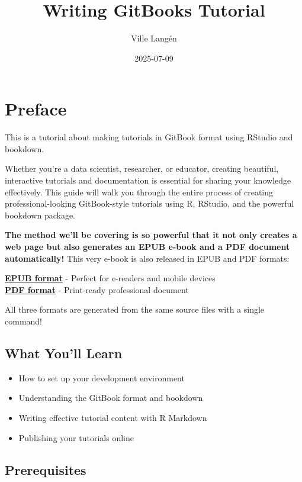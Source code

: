 \documentclass[
]{book}
\title{Writing GitBooks Tutorial}
\author{Ville Langén}
\date{2025-07-09}
\providecommand{\tightlist}{%
  \setlength{\itemsep}{0pt}\setlength{\parskip}{0pt}}
\begin{document}
\maketitle

{
\setcounter{tocdepth}{1}
\tableofcontents
}
\chapter*{Preface}\label{preface}

This is a tutorial about making tutorials in GitBook format using RStudio and bookdown.

Whether you're a data scientist, researcher, or educator, creating beautiful, interactive tutorials and documentation is essential for sharing your knowledge effectively. This guide will walk you through the entire process of creating professional-looking GitBook-style tutorials using R, RStudio, and the powerful bookdown package.

\textbf{The method we'll be covering is so powerful that it not only creates a web page but also generates an EPUB e-book and a PDF document automatically!} This very e-book is also released in EPUB and PDF formats:

\textbf{\href{writing-gitbooks-tutorial.epub}{EPUB format}} - Perfect for e-readers and mobile devices\\
\textbf{\href{writing-gitbooks-tutorial.pdf}{PDF format}} - Print-ready professional document

All three formats are generated from the same source files with a single command!

\section*{What You'll Learn}\label{what-youll-learn}

\begin{itemize}
\tightlist
\item
  How to set up your development environment
\item
  Understanding the GitBook format and bookdown
\item
  Writing effective tutorial content with R Markdown
\item
  Publishing your tutorials online
\end{itemize}

\section*{Prerequisites}\label{prerequisites}
\end{document}
